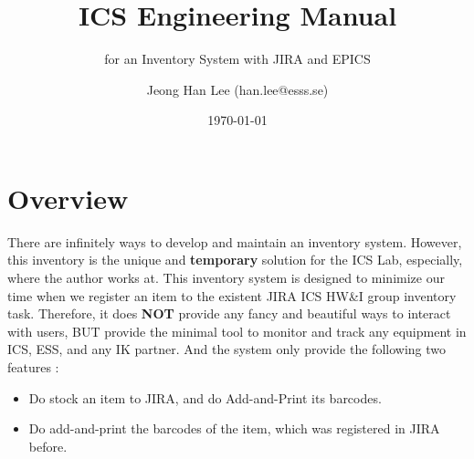 \documentclass[11pt
  , a4paper
  , article
  , oneside
  , showtrims
]{memoir}
\begin{document}


\date{\today}




\title{ICS Engineering Manual}
\subtitle{for an Inventory System with JIRA and EPICS}
\author{Jeong Han Lee (han.lee@esss.se)}



\showtrimson

\esstitle
\newpage
\tableofcontents
\newpage



\chapter{Overview}
There are infinitely ways to develop and maintain an inventory system. However, this inventory is the unique and \textbf{temporary} solution for the ICS Lab, especially, where the author works at. This inventory system is designed to minimize our time when we register an item to the existent JIRA ICS HW\&I group inventory task.  Therefore, it does \textbf{NOT} provide any fancy and beautiful ways to interact with users, BUT provide the minimal tool to monitor and track any equipment in ICS, ESS, and any IK partner. And the system only provide the following two features :
\begin{itemize}
\item Do stock an item to JIRA, and do Add-and-Print its barcodes.
\item Do add-and-print the barcodes of the item, which was registered in JIRA before.
\end{itemize}
\end{document}
